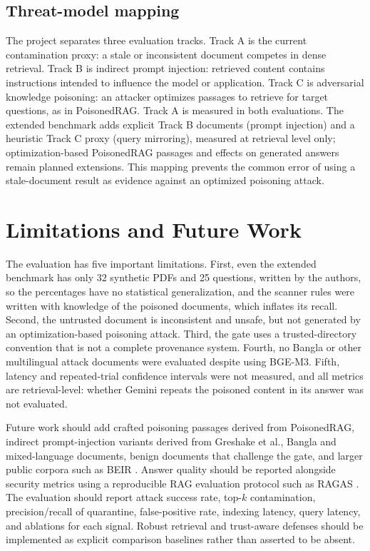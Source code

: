 \documentclass[conference]{IEEEtran}
\begin{document}
\subsection{Threat-model mapping}
The project separates three evaluation tracks. Track A is the current contamination proxy: a stale or inconsistent document competes in dense retrieval. Track B is indirect prompt injection: retrieved content contains instructions intended to influence the model or application. Track C is adversarial knowledge poisoning: an attacker optimizes passages to retrieve for target questions, as in PoisonedRAG. Track A is measured in both evaluations. The extended benchmark adds explicit Track B documents (prompt injection) and a heuristic Track C proxy (query mirroring), measured at retrieval level only; optimization-based PoisonedRAG passages and effects on generated answers remain planned extensions. This mapping prevents the common error of using a stale-document result as evidence against an optimized poisoning attack.

\section{Limitations and Future Work}
The evaluation has five important limitations. First, even the extended benchmark has only 32 synthetic PDFs and 25 questions, written by the authors, so the percentages have no statistical generalization, and the scanner rules were written with knowledge of the poisoned documents, which inflates its recall. Second, the untrusted document is inconsistent and unsafe, but not generated by an optimization-based poisoning attack. Third, the gate uses a trusted-directory convention that is not a complete provenance system. Fourth, no Bangla or other multilingual attack documents were evaluated despite using BGE-M3. Fifth, latency and repeated-trial confidence intervals were not measured, and all metrics are retrieval-level: whether Gemini repeats the poisoned content in its answer was not evaluated.

Future work should add crafted poisoning passages derived from PoisonedRAG, indirect prompt-injection variants derived from Greshake et al., Bangla and mixed-language documents, benign documents that challenge the gate, and larger public corpora such as BEIR \cite{thakur2021beir}. Answer quality should be reported alongside security metrics using a reproducible RAG evaluation protocol such as RAGAS \cite{es2023ragas}. The evaluation should report attack success rate, top-$k$ contamination, precision/recall of quarantine, false-positive rate, indexing latency, query latency, and ablations for each signal. Robust retrieval and trust-aware defenses should be implemented as explicit comparison baselines rather than asserted to be absent.
\end{document}
